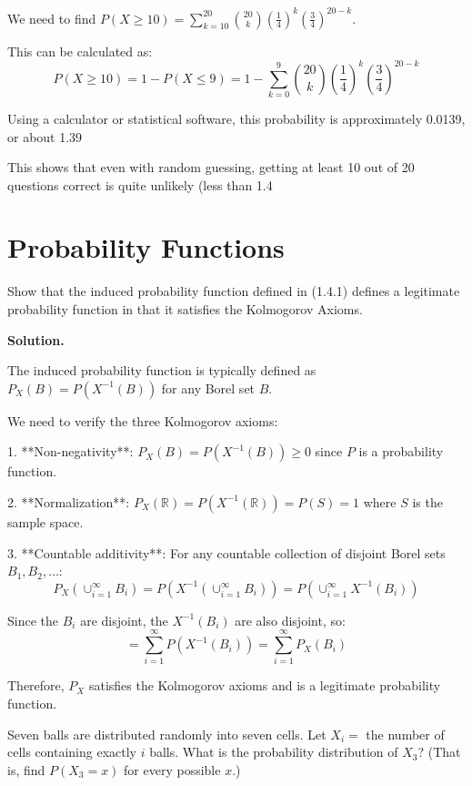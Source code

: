 We need to find $P(X \geq 10) = \sum_{k=10}^{20} \binom{20}{k} \left(\frac{1}{4}\right)^k \left(\frac{3}{4}\right)^{20-k}$.

This can be calculated as:
\[ P(X \geq 10) = 1 - P(X \leq 9) = 1 - \sum_{k=0}^{9} \binom{20}{k} \left(\frac{1}{4}\right)^k \left(\frac{3}{4}\right)^{20-k} \]

Using a calculator or statistical software, this probability is approximately 0.0139, or about 1.39%

This shows that even with random guessing, getting at least 10 out of 20 questions correct is quite unlikely (less than 1.4%


\section{Probability Functions}

\begin{problembox}
Show that the induced probability function defined in (1.4.1) defines a legitimate probability function in that it satisfies the Kolmogorov Axioms.
\end{problembox}

\noindent\textbf{Solution.}

The induced probability function is typically defined as $P_X(B) = P(X^{-1}(B))$ for any Borel set $B$.

We need to verify the three Kolmogorov axioms:

1. **Non-negativity**: $P_X(B) = P(X^{-1}(B)) \geq 0$ since $P$ is a probability function.

2. **Normalization**: $P_X(\mathbb{R}) = P(X^{-1}(\mathbb{R})) = P(S) = 1$ where $S$ is the sample space.

3. **Countable additivity**: For any countable collection of disjoint Borel sets $B_1, B_2, \ldots$:
   \[ P_X(\cup_{i=1}^{\infty} B_i) = P(X^{-1}(\cup_{i=1}^{\infty} B_i)) = P(\cup_{i=1}^{\infty} X^{-1}(B_i)) \]
   
   Since the $B_i$ are disjoint, the $X^{-1}(B_i)$ are also disjoint, so:
   \[ = \sum_{i=1}^{\infty} P(X^{-1}(B_i)) = \sum_{i=1}^{\infty} P_X(B_i) \]

Therefore, $P_X$ satisfies the Kolmogorov axioms and is a legitimate probability function.


\begin{problembox}
Seven balls are distributed randomly into seven cells. Let $X_{i}=$ the number of cells containing exactly $i$ balls. What is the probability distribution of $X_{3}$? (That is, find $P(X_{3}=x)$ for every possible $x$.)
\end{problembox}

